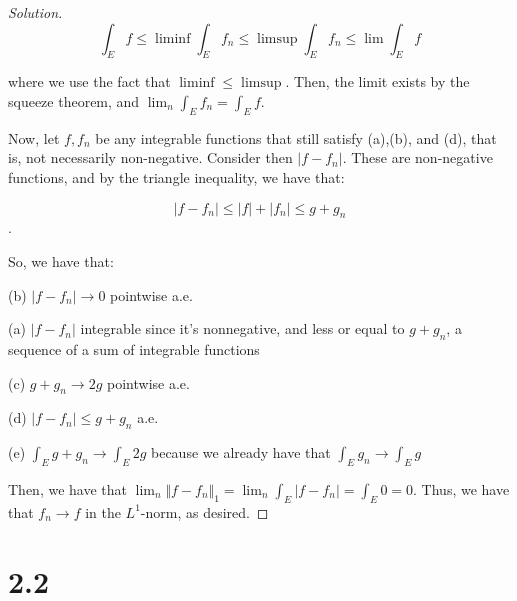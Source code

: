 \documentclass[10pt]{article}
\begin{document}
\begin{proof}[Solution]
$$ \int_E f \leq \liminf \int_E f_n \leq \limsup \int_E f_n \leq \lim \int_E f$$

where we use the fact that $\liminf \leq \limsup$. Then, the limit exists by the squeeze theorem, and $\lim_n \int_E f_n = \int_E f$.

Now, let $f, f_n$ be any integrable functions that still satisfy (a),(b), and (d), that is, not necessarily non-negative. Consider then $|f - f_n|$. These are non-negative functions, and by the triangle inequality, we have that:

$$ |f - f_n| \leq |f| + |f_n| \leq g + g_n $$.

So, we have that: 

(b) $|f - f_n| \to 0$ pointwise a.e.

(a) $|f - f_n|$ integrable since it's nonnegative, and less or equal to $g + g_n$, a sequence of a sum of integrable functions

(c) $g + g_n \to 2g$ pointwise a.e.

(d) $|f - f_n| \leq g + g_n$ a.e.

(e) $\int_E g + g_n \to \int_E 2g$ because we already have that $\int_E g_n \to \int_E g$

Then, we have that $\lim_n \Vert f - f_n \Vert_1 = \lim_n \int_E |f - f_n| = \int_E 0 = 0$. Thus, we have that $f_n \to f$ in the $L^1$-norm, as desired.
\end{proof}

\section*{2.2}
\end{document}
